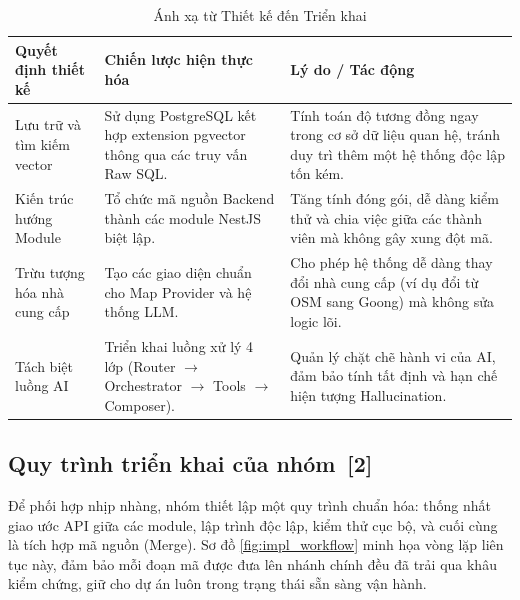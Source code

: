 \documentclass[12pt, a4paper]{article}
\begin{document}
\begin{table}[H]
    \centering
    \renewcommand{\arraystretch}{1.5}
    \begin{tabularx}{\textwidth}{|>{\raggedright\arraybackslash}p{3cm}|>{\raggedright\arraybackslash}p{5cm}|X|}
        \hline
        \textbf{Quyết định thiết kế} & \textbf{Chiến lược hiện thực hóa} & \textbf{Lý do / Tác động} \\
        \hline
        Lưu trữ và tìm kiếm vector & Sử dụng PostgreSQL kết hợp extension pgvector thông qua các truy vấn Raw SQL. & Tính toán độ tương đồng ngay trong cơ sở dữ liệu quan hệ, tránh duy trì thêm một hệ thống độc lập tốn kém. \\
        \hline
        Kiến trúc hướng Module & Tổ chức mã nguồn Backend thành các module NestJS biệt lập. & Tăng tính đóng gói, dễ dàng kiểm thử và chia việc giữa các thành viên mà không gây xung đột mã. \\
        \hline
        Trừu tượng hóa nhà cung cấp & Tạo các giao diện chuẩn cho Map Provider và hệ thống LLM. & Cho phép hệ thống dễ dàng thay đổi nhà cung cấp (ví dụ đổi từ OSM sang Goong) mà không sửa logic lõi. \\
        \hline
        Tách biệt luồng AI & Triển khai luồng xử lý 4 lớp (Router $\to$ Orchestrator $\to$ Tools $\to$ Composer). & Quản lý chặt chẽ hành vi của AI, đảm bảo tính tất định và hạn chế hiện tượng Hallucination. \\
        \hline
    \end{tabularx}
    \caption{Ánh xạ từ Thiết kế đến Triển khai}
    \label{tab:design_to_impl}
\end{table}

\subsection[Quy trình triển khai của nhóm]{Quy trình triển khai của nhóm \,{\normalfont\small\textcolor{cyan!70!black}{[2]}}}

Để phối hợp nhịp nhàng, nhóm thiết lập một quy trình chuẩn hóa: thống nhất giao ước API giữa các module, lập trình độc lập, kiểm thử cục bộ, và cuối cùng là tích hợp mã nguồn (Merge). Sơ đồ \ref{fig:impl_workflow} minh họa vòng lặp liên tục này, đảm bảo mỗi đoạn mã được đưa lên nhánh chính đều đã trải qua khâu kiểm chứng, giữ cho dự án luôn trong trạng thái sẵn sàng vận hành.
\end{document}
